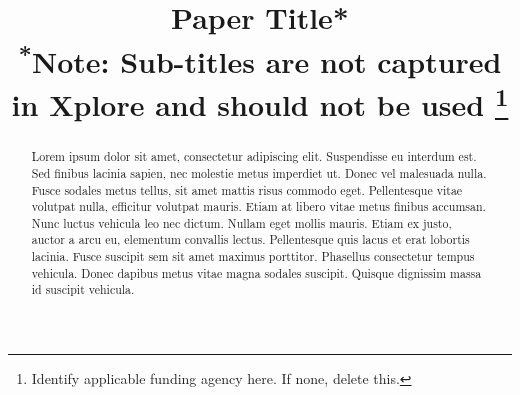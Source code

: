 \documentclass[conference]{IEEEtran}
\begin{document}
\title{Paper Title*\\
{\footnotesize \textsuperscript{*}Note: Sub-titles are not captured in Xplore and
should not be used}
\thanks{Identify applicable funding agency here. If none, delete this.}
}

\author{
\and
{}
\and
{}
\and
{}
\and
{}
\and
{}
}

\maketitle

\begin{abstract}
	Lorem ipsum dolor sit amet, consectetur adipiscing elit. Suspendisse eu interdum est. Sed finibus lacinia sapien, nec molestie metus imperdiet ut. Donec vel malesuada nulla. Fusce sodales metus tellus, sit amet mattis risus commodo eget. Pellentesque vitae volutpat nulla, efficitur volutpat mauris. Etiam at libero vitae metus finibus accumsan. Nunc luctus vehicula leo nec dictum. Nullam eget mollis mauris. Etiam ex justo, auctor a arcu eu, elementum convallis lectus. Pellentesque quis lacus et erat lobortis lacinia. Fusce suscipit sem sit amet maximus porttitor. Phasellus consectetur tempus vehicula. Donec dapibus metus vitae magna sodales suscipit. Quisque dignissim massa id suscipit vehicula. 
\end{abstract}
\end{document}
